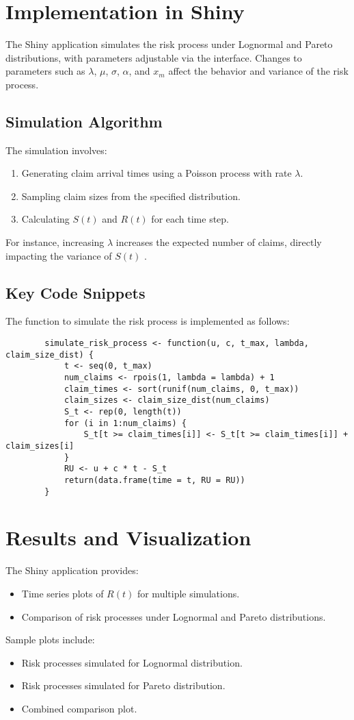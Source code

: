 \documentclass[12pt]{article}
\begin{document}
	\section{Implementation in Shiny}
	The Shiny application simulates the risk process under Lognormal and Pareto distributions, with parameters adjustable via the interface. Changes to parameters such as $\lambda$, $\mu$, $\sigma$, $\alpha$, and $x_m$ affect the behavior and variance of the risk process.
	
	\subsection{Simulation Algorithm}
	The simulation involves:
	\begin{enumerate}
		\item Generating claim arrival times using a Poisson process with rate $\lambda$.
		\item Sampling claim sizes from the specified distribution.
		\item Calculating $S(t)$ and $R(t)$ for each time step.
	\end{enumerate}
	For instance, increasing $\lambda$ increases the expected number of claims, directly impacting the variance of $S(t)$ \cite{Embrechts.etal1997}.
	
	\subsection{Key Code Snippets}
	The function to simulate the risk process is implemented as follows:
	\begin{verbatim}
		simulate_risk_process <- function(u, c, t_max, lambda, claim_size_dist) {
			t <- seq(0, t_max)
			num_claims <- rpois(1, lambda = lambda) + 1
			claim_times <- sort(runif(num_claims, 0, t_max))
			claim_sizes <- claim_size_dist(num_claims)
			S_t <- rep(0, length(t))
			for (i in 1:num_claims) {
				S_t[t >= claim_times[i]] <- S_t[t >= claim_times[i]] + claim_sizes[i]
			}
			RU <- u + c * t - S_t
			return(data.frame(time = t, RU = RU))
		}
	\end{verbatim}
	
	\section{Results and Visualization}
	The Shiny application provides:
	\begin{itemize}
		\item Time series plots of $R(t)$ for multiple simulations.
		\item Comparison of risk processes under Lognormal and Pareto distributions.
	\end{itemize}
	Sample plots include:
	\begin{itemize}
		\item Risk processes simulated for Lognormal distribution.
		\item Risk processes simulated for Pareto distribution.
		\item Combined comparison plot.
	\end{itemize}
	
\end{document}
